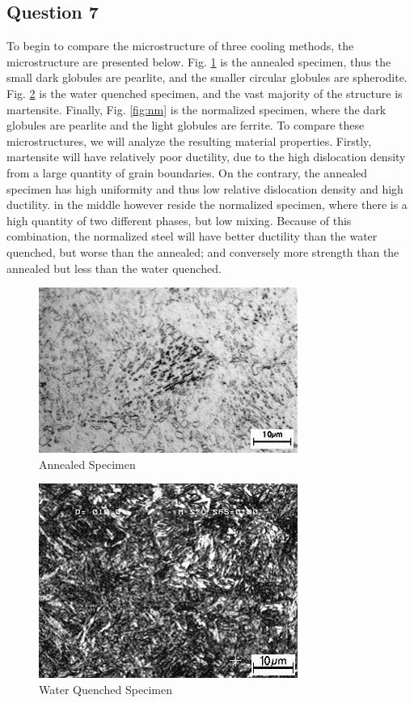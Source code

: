 \documentclass{article}
\begin{document}
\subsection*{Question 7}
To begin to compare the microstructure of three cooling methods, the microstructure are presented below. Fig. \ref{fig:an} is the annealed specimen, thus the small dark globules are pearlite, and the smaller circular globules are spherodite. Fig. \ref{fig:wq} is the water quenched specimen, and the vast majority of the structure is martensite. Finally, Fig. \ref{fig:nm} is the normalized specimen, where the dark globules are pearlite and the light globules are ferrite. To compare these microstructures, we will analyze the resulting material properties. Firstly, martensite will have relatively poor ductility, due to the high dislocation density from a large quantity of grain boundaries. On the contrary, the annealed specimen has high uniformity and thus low relative dislocation density and high ductility. in the middle however reside the normalized specimen, where there is a high quantity of two different phases, but low mixing. Because of this combination, the normalized steel will have better ductility than the water quenched, but worse than the annealed; and conversely more strength than the annealed but less than the water quenched.  
\newpage
\begin{figure}[!h!]
    \centering
    \includegraphics[width=0.5\linewidth]{plots/microA.jpg}
    \caption{Annealed Specimen}
    \label{fig:an}
\end{figure}
\begin{figure}[!h!]
    \centering
    \includegraphics[width=0.5\linewidth]{plots/microB.jpg}
    \caption{Water Quenched Specimen}
    \label{fig:wq}
\end{figure}
\end{document}
